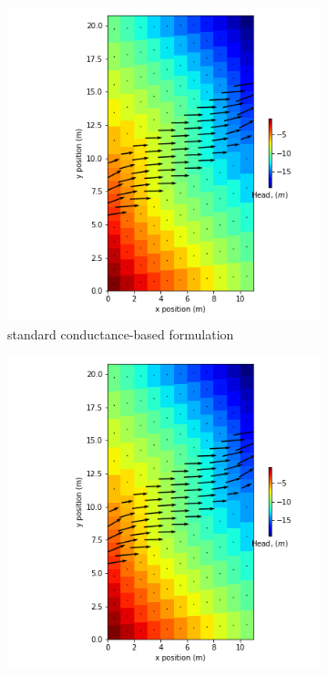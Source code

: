 \documentclass{article}
\begin{document}
\begin{figure}[H]
\centering
\begin{subfigure}{0.4\textwidth}
	\includegraphics[width=\textwidth]{../figures/disu-d-af-vo-s-head.png}
	\caption{standard conductance-based formulation}
	\label{fig:disu-s-nocc-head}
\end{subfigure}
\hfill
\begin{subfigure}{0.4\textwidth}
	\includegraphics[width=\textwidth]{../figures/disu-d-af-vo-x-head.png}

\end{subfigure}
\end{figure}
\end{document}
